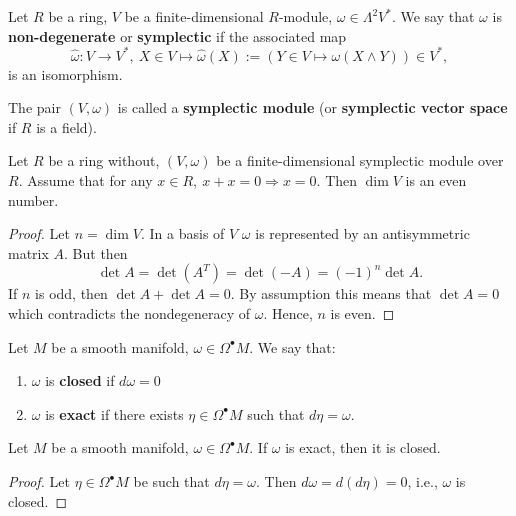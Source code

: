 \begin{definition}
  Let
    $R$ be a ring,
    $V$ be a finite-dimensional $R$-module,
    $\omega \in \Lambda^2 V^*$.
  We say that $\omega$ is \textbf{non-degenerate} or \textbf{symplectic}
  if the associated map
  \begin{equation}
    \hat{\omega} \colon V \to V^*,\
    X \in V \mapsto \hat{\omega}(X)
    := (Y \in V \mapsto \omega(X \wedge Y))
    \in V^*,
  \end{equation}
  is an isomorphism.

  The pair $(V, \omega)$ is called a \textbf{symplectic module}
  (or \textbf{symplectic vector space} if $R$ is a field).
\end{definition}
\begin{proposition}
  Let
    $R$ be a ring without,
    $(V, \omega)$ be a finite-dimensional symplectic module over $R$.
  Assume that for any $x \in R,\ x + x = 0 \Rightarrow x = 0$.
  Then $\dim V$ is an even number.
\end{proposition}
\begin{proof}
  Let $n = \dim V$.
  In a basis of $V$ $\omega$ is represented by an antisymmetric matrix $A$.
  But then
  \begin{equation}
    \det A = \det(A^T) = \det(-A) = (-1)^n \det A.
  \end{equation}
  If $n$ is odd, then $\det A + \det A = 0$.
  By assumption this means that $\det A = 0$
  which contradicts the nondegeneracy of $\omega$.
  Hence, $n$ is even.
\end{proof}
\begin{definition}
  Let $M$ be a smooth manifold, $\omega \in \Omega^\bullet M$.
  We say that:
  \begin{enumerate}
    \item
      $\omega$ is \textbf{closed} if $d \omega = 0$
    \item
      $\omega$ is \textbf{exact} if there exists $\eta \in \Omega^\bullet M$
      such that $d \eta = \omega$.
  \end{enumerate}
\end{definition}
\begin{proposition}
  Let $M$ be a smooth manifold, $\omega \in \Omega^\bullet M$.
  If $\omega$ is exact, then it is closed.
\end{proposition}
\begin{proof}
  Let $\eta \in \Omega^\bullet M$ be such that $d \eta = \omega$.
  Then $d \omega = d (d \eta) = 0$, i.e., $\omega$ is closed.
\end{proof}
